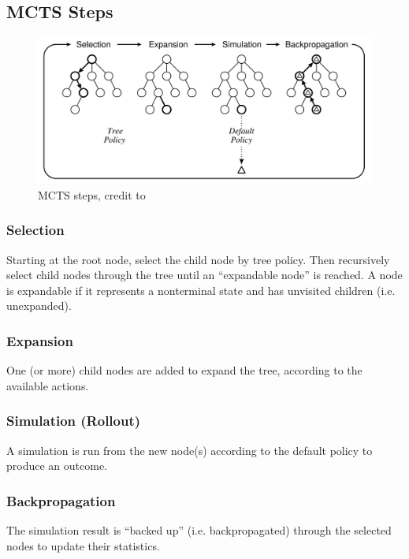 \subsection{MCTS Steps}

\begin{figure}
  \begin{center}
    \includegraphics[width=\textwidth]{mcts-steps.jpg}
  \end{center}
  \caption{MCTS steps, credit to \cite{mcts-survey}}
  \label{fig:mcts-steps}
\end{figure}

\subsubsection{Selection}
Starting at the root node, select the child node by tree policy. Then recursively select child nodes through the tree until an ``expandable node'' is reached. A node is expandable if it represents a nonterminal state and has unvisited children (i.e. unexpanded).

\subsubsection{Expansion}
One (or more) child nodes are added to expand the tree, according to the available actions.

\subsubsection{Simulation (Rollout)}
A simulation is run from the new node(s) according to the default policy to produce an outcome.
\subsubsection{Backpropagation}
The simulation result is ``backed up'' (i.e. backpropagated) through the selected nodes to update their statistics.

